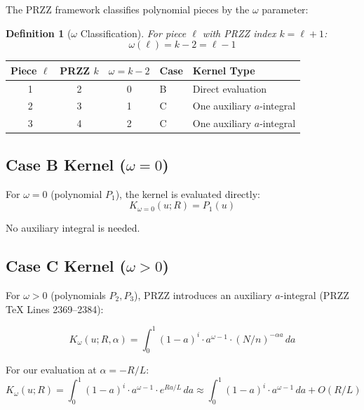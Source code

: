 \documentclass[11pt]{article}
\newtheorem{definition}{Definition}
\begin{document}
The PRZZ framework classifies polynomial pieces by the $\omega$ parameter:

\begin{definition}[$\omega$ Classification]
For piece $\ell$ with PRZZ index $k = \ell + 1$:
\begin{equation}
\omega(\ell) = k - 2 = \ell - 1
\end{equation}
\end{definition}

\begin{center}
\begin{tabular}{cccll}
\toprule
Piece $\ell$ & PRZZ $k$ & $\omega = k-2$ & Case & Kernel Type \\
\midrule
1 & 2 & 0 & B & Direct evaluation \\
2 & 3 & 1 & C & One auxiliary $a$-integral \\
3 & 4 & 2 & C & One auxiliary $a$-integral \\
\bottomrule
\end{tabular}
\end{center}

\subsection{Case B Kernel ($\omega = 0$)}

For $\omega = 0$ (polynomial $P_1$), the kernel is evaluated directly:
\begin{equation}
K_{\omega=0}(u; R) = P_1(u)
\end{equation}

No auxiliary integral is needed.

\subsection{Case C Kernel ($\omega > 0$)}

For $\omega > 0$ (polynomials $P_2, P_3$), PRZZ introduces an auxiliary $a$-integral (PRZZ TeX Lines 2369--2384):

\begin{equation}
\boxed{
K_\omega(u; R, \alpha) = \int_0^1 (1-a)^i \cdot a^{\omega-1} \cdot (N/n)^{-\alpha a} \, da
}
\end{equation}

For our evaluation at $\alpha = -R/L$:
\begin{equation}
K_\omega(u; R) = \int_0^1 (1-a)^i \cdot a^{\omega-1} \cdot e^{Ra/L} \, da \approx \int_0^1 (1-a)^i \cdot a^{\omega-1} \, da + O(R/L)
\end{equation}
\end{document}
